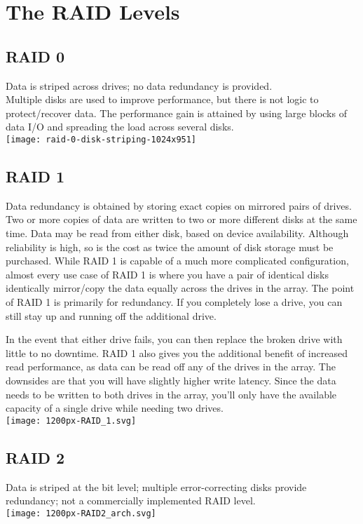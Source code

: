 \documentclass{article}
\begin{document}
\section{The RAID Levels }

\subsection{RAID 0}
Data is striped across drives; no data redundancy is provided.\\
Multiple disks are used to improve performance, but there is not logic to protect/recover data. The performance gain is attained by using large blocks of data I/O and spreading the load across several disks. \\
\texttt{[image: raid-0-disk-striping-1024x951]} 

\subsection{RAID 1}
Data redundancy is obtained by storing exact copies on mirrored pairs of drives.
Two or more copies of data are written to two or more different disks at the same time. Data may be read from either disk, based on device availability. Although reliability is high, so is the cost as twice the amount of disk storage must be purchased.
While RAID 1 is capable of a much more complicated configuration, almost every use case of RAID 1 is where you have a pair of identical disks identically mirror/copy the data equally across the drives in the array. The point of RAID 1 is primarily for redundancy. If you completely lose a drive, you can still stay up and running off the additional drive.

In the event that either drive fails, you can then replace the broken drive with little to no downtime. RAID 1 also gives you the additional benefit of increased read performance, as data can be read off any of the drives in the array. The downsides are that you will have slightly higher write latency. Since the data needs to be written to both drives in the array, you'll only have the available capacity of a single drive while needing two drives.\\
\texttt{[image: 1200px-RAID\_1.svg]} 
\subsection{RAID 2}
Data is striped at the bit level; multiple error-correcting disks provide redundancy; not a commercially implemented RAID level.\\
\texttt{[image: 1200px-RAID2\_arch.svg]} 
\end{document}
